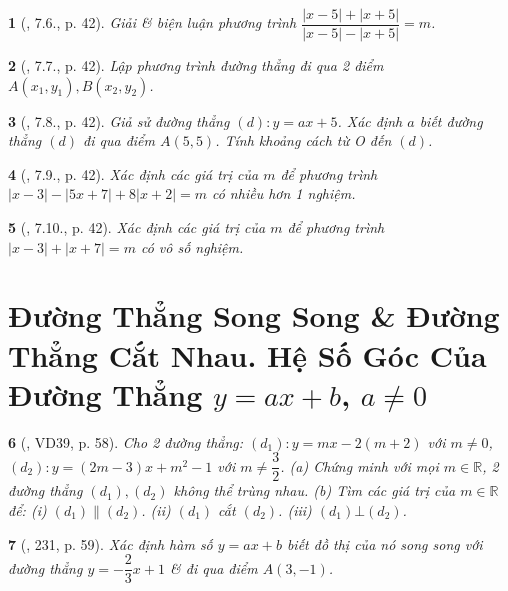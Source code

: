 \documentclass{article}
\newtheorem{baitoan}{}
\begin{document}
\begin{baitoan}[\cite{TLCT_THCS_Toan_9_dai_so}, 7.6., p. 42]
	Giải \& biện luận phương trình $\dfrac{|x - 5| + |x + 5|}{|x - 5| - |x + 5|} = m$.
\end{baitoan}

\begin{baitoan}[\cite{TLCT_THCS_Toan_9_dai_so}, 7.7., p. 42]
	Lập phương trình đường thẳng đi qua 2 điểm $A(x_1,y_1),B(x_2,y_2)$.
\end{baitoan}

\begin{baitoan}[\cite{TLCT_THCS_Toan_9_dai_so}, 7.8., p. 42]
	Giả sử đường thẳng $(d):y = ax + 5$. Xác định $a$ biết đường thẳng $(d)$ đi qua điểm $A(5,5)$. Tính khoảng cách từ O đến $(d)$.
\end{baitoan}

\begin{baitoan}[\cite{TLCT_THCS_Toan_9_dai_so}, 7.9., p. 42]
	Xác định các giá trị của $m$ để phương trình $|x - 3| - |5x + 7| + 8|x + 2| = m$ có nhiều hơn 1 nghiệm.
\end{baitoan}

\begin{baitoan}[\cite{TLCT_THCS_Toan_9_dai_so}, 7.10., p. 42]
	Xác định các giá trị của $m$ để phương trình $|x - 3| + |x + 7| = m$ có vô số nghiệm.
\end{baitoan}


\section{Đường Thẳng Song Song \& Đường Thẳng Cắt Nhau. Hệ Số Góc Của Đường Thẳng $y = ax + b$, $a\ne0$}

\begin{baitoan}[\cite{Tuyen_Toan_8}, VD39, p. 58]
	Cho 2 đường thẳng: $(d_1):y = mx - 2(m + 2)$ với $m\ne0$, $(d_2):y = (2m - 3)x + m^2 - 1$ với $m\ne\dfrac{3}{2}$. (a) Chứng minh với mọi $m\in\mathbb{R}$, 2 đường thẳng $(d_1),(d_2)$ không thể trùng nhau. (b) Tìm các giá trị của $m\in\mathbb{R}$ để: (i) $(d_1)\parallel(d_2)$. (ii) $(d_1)$ cắt $(d_2)$. (iii) $(d_1)\bot(d_2)$.
\end{baitoan}

\begin{baitoan}[\cite{Tuyen_Toan_8}, 231, p. 59]
	Xác định hàm số $y = ax + b$ biết đồ thị của nó song song với đường thẳng $y = -\dfrac{2}{3}x + 1$ \& đi qua điểm $A(3,-1)$.
\end{baitoan}
\end{document}
